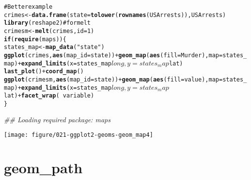 \documentclass[a4paper,titlepage]{tufte-handout}\usepackage{graphicx, color}
\makeatletter
\def\maxwidth{ %
  \ifdim\Gin@nat@width>\linewidth
    \linewidth
  \else
    \Gin@nat@width
  \fi
}
\newcommand{\hlfunctioncall}[1]{\textcolor[rgb]{0.501960784313725,0,0.329411764705882}{\textbf{#1}}}%
\newcommand{\hlstring}[1]{\textcolor[rgb]{0.6,0.6,1}{#1}}%
\newcommand{\hlcomment}[1]{\textcolor[rgb]{0.180392156862745,0.6,0.341176470588235}{#1}}%
\newenvironment{kframe}{%
 \def\at@end@of@kframe{}%
 \ifinner\ifhmode%
  \def\at@end@of@kframe{\end{minipage}}%
  \begin{minipage}{\columnwidth}%
 \fi\fi%
 \def\FrameCommand##1{\hskip\@totalleftmargin \hskip-\fboxsep
 \colorbox{shadecolor}{##1}\hskip-\fboxsep
     \hskip-\linewidth \hskip-\@totalleftmargin \hskip\columnwidth}%
 \MakeFramed {\advance\hsize-\width
   \@totalleftmargin\z@ \linewidth\hsize
   \@setminipage}}%
 {\par\unskip\endMakeFramed%
 \at@end@of@kframe}
\newenvironment{knitrout}{}{} %
\makeatother
\begin{document}
\begin{knitrout}
\begin{kframe}
\begin{alltt}
\hlcomment{# Better example}
crimes <- \hlfunctioncall{data.frame}(state = \hlfunctioncall{tolower}(\hlfunctioncall{rownames}(USArrests)), USArrests)
\hlfunctioncall{library}(reshape2) \hlcomment{# for melt}
crimesm <- \hlfunctioncall{melt}(crimes, id = 1)
\hlfunctioncall{if} (\hlfunctioncall{require}(maps)) \{
  states_map <- \hlfunctioncall{map_data}(\hlstring{"state"})
  \hlfunctioncall{ggplot}(crimes, \hlfunctioncall{aes}(map_id = state)) + \hlfunctioncall{geom_map}(\hlfunctioncall{aes}(fill = Murder), map = states_map) + \hlfunctioncall{expand_limits}(x = states_map$long, y = states_map$lat)
  \hlfunctioncall{last_plot}() + \hlfunctioncall{coord_map}()
  \hlfunctioncall{ggplot}(crimesm, \hlfunctioncall{aes}(map_id = state)) + \hlfunctioncall{geom_map}(\hlfunctioncall{aes}(fill = value), map = states_map) + \hlfunctioncall{expand_limits}(x = states_map$long, y = states_map$lat) + \hlfunctioncall{facet_wrap}( ~ variable)
\}
\end{alltt}


{\ttfamily\noindent\itshape\textcolor{messagecolor}{\#\# Loading required package: maps}}\end{kframe}\texttt{[image: figure/021-ggplot2-geoms-geom\_map4]} 
\end{knitrout}


\section{geom\_path}
\end{document}
